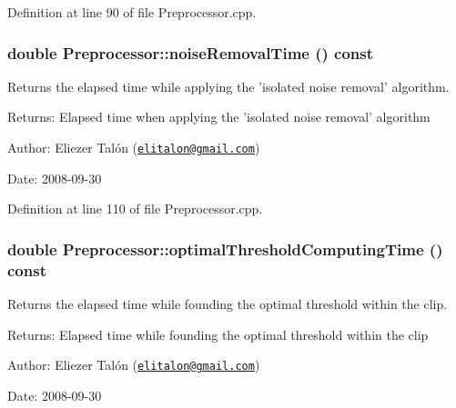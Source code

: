 Definition at line 90 of file Preprocessor.cpp.\hypertarget{class_preprocessor_0cccd23820430541f18f2b24dbfd0784}{
\subsubsection[noiseRemovalTime]{\setlength{\rightskip}{0pt plus 5cm}double Preprocessor::noiseRemovalTime () const}}
\label{class_preprocessor_0cccd23820430541f18f2b24dbfd0784}


Returns the elapsed time while applying the 'isolated noise removal' algorithm. 

\begin{Desc}
\item[Returns:]Elapsed time when applying the 'isolated noise removal' algorithm\end{Desc}
\begin{Desc}
\item[Author:]Eliezer Talón (\href{mailto:elitalon@gmail.com}{\tt elitalon@gmail.com}) \end{Desc}
\begin{Desc}
\item[Date:]2008-09-30 \end{Desc}


Definition at line 110 of file Preprocessor.cpp.\hypertarget{class_preprocessor_72dd29238c4202698e67dcb26a47f4b5}{
\subsubsection[optimalThresholdComputingTime]{\setlength{\rightskip}{0pt plus 5cm}double Preprocessor::optimalThresholdComputingTime () const}}
\label{class_preprocessor_72dd29238c4202698e67dcb26a47f4b5}


Returns the elapsed time while founding the optimal threshold within the clip. 

\begin{Desc}
\item[Returns:]Elapsed time while founding the optimal threshold within the clip\end{Desc}
\begin{Desc}
\item[Author:]Eliezer Talón (\href{mailto:elitalon@gmail.com}{\tt elitalon@gmail.com}) \end{Desc}
\begin{Desc}
\item[Date:]2008-09-30 \end{Desc}


